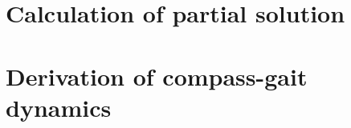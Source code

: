 \chapter{Calculation of partial solution} \label{app:partialsol}
\setcounter{figure}{0}\setcounter{equation}{0}\setcounter{table}{0}


\chapter{Derivation of compass-gait dynamics} \label{app:cgdyn}
\setcounter{figure}{0}\setcounter{equation}{0}\setcounter{table}{0}
